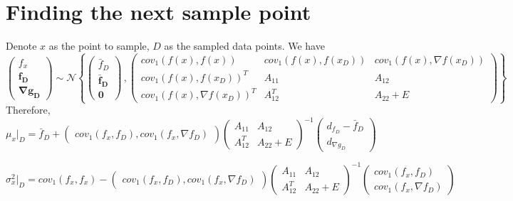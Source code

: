 \documentclass[a4paper,onecolumn]{article}
\theoremstyle{remark}
\begin{document}
\section{Finding the next sample point}
Denote $x$ as the point to sample, $D$ as the sampled data points. We have
\begin{equation}
    \begin{pmatrix}
        f_x\\
        \boldsymbol{f_D}\\
        \boldsymbol{\nabla g_D}
    \end{pmatrix}
    \sim
    \mathcal{N}\left\{
    \begin{pmatrix}
        \bar{f}_D\\
        \boldsymbol{\bar{f}_D}\\
        \boldsymbol{0}
    \end{pmatrix}
    \,,
    \begin{pmatrix}
        cov_1\left(f(x), f(x)\right) & cov_1(f(x), f(x_D)) & cov_1(f(x), \nabla f(x_D))\\
        cov_1(f(x), f(x_D))^T & A_{11} & A_{12}\\
        cov_1(f(x), \nabla f(x_D))^T & A_{12}^T & A_{22}+E
    \end{pmatrix}
    \right\}
\end{equation}
Therefore,
\begin{equation}
    \mu_{x}|_D = \bar{f}_D +
    \begin{pmatrix}
        cov_1(f_x, f_D) , cov_1(f_x, \nabla f_D)
    \end{pmatrix}
    \begin{pmatrix}
        A_{11} & A_{12}\\
        A_{12}^T & A_{22} + E
    \end{pmatrix}^{-1}
    \begin{pmatrix}
        d_{f_D} - \bar{f}_D\\
        d_{\nabla g_D}
    \end{pmatrix}
\end{equation}

\begin{equation}
    \sigma_{x}^2|_D = cov_1(f_x, f_x) -
    \begin{pmatrix}
        cov_1(f_x, f_D) , cov_1(f_x, \nabla f_D)
    \end{pmatrix}
    \begin{pmatrix}
        A_{11} & A_{12}\\
        A_{12}^T & A_{22} + E
    \end{pmatrix}^{-1}
    \begin{pmatrix}
        cov_1(f_x, f_D) \\ cov_1(f_x, \nabla f_D)
    \end{pmatrix}
\end{equation}
\end{document}
